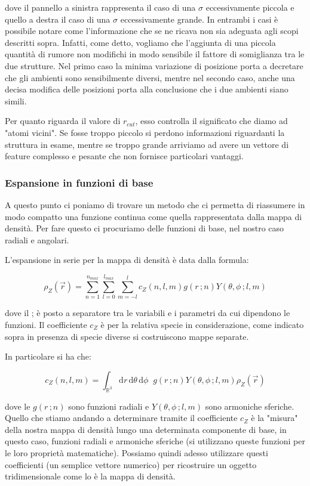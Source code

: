 dove il pannello a sinistra rappresenta il caso di una $\sigma$ eccessivamente piccola e quello a destra il caso di una $\sigma$ eccessivamente grande. In entrambi i casi è possibile notare come l'informazione che se ne ricava non sia adeguata agli scopi descritti sopra. Infatti, come detto, vogliamo che l'aggiunta di una piccola quantità di rumore non modifichi in modo sensibile il fattore di somiglianza tra le due strutture. Nel primo caso la minima variazione di posizione porta a decretare che gli ambienti sono sensibilmente diversi, mentre nel secondo caso, anche una decisa modifica delle posizioni porta alla conclusione che i due ambienti siano simili.

Per quanto riguarda il valore di $r_{cut}$, esso controlla il significato che diamo ad "atomi vicini". Se fosse troppo piccolo si perdono informazioni riguardanti la struttura in esame, mentre se troppo grande arriviamo ad avere un vettore di feature complesso e pesante che non fornisce particolari vantaggi.

\subsubsection{Espansione in funzioni di base}
A questo punto ci poniamo di trovare un metodo che ci permetta di riassumere in modo compatto una funzione continua come quella rappresentata dalla mappa di densità. Per fare questo ci procuriamo delle funzioni di base, nel nostro caso radiali e angolari.

L'espansione in serie per la mappa di densità è data dalla formula:

\begin{equation}
    \rho_Z(\vec{r}) = \sum_{n=1}^{n_{max}} \sum_{l=0}^{l_{max}} \sum_{m=-l}^{l} c_Z(n,l,m) g(r \,;n) Y(\theta, \phi \,; l,m)
\end{equation}

dove il ; è posto a separatore tra le variabili e i parametri da cui dipendono le funzioni. Il coefficiente $c_Z$ è per la relativa specie in considerazione, come indicato sopra in presenza di specie diverse si costruiscono mappe separate.

In particolare si ha che:

\begin{equation}
    c_Z(n,l,m) = \int_{\mathbb{R}^3} \mathrm{d}r\, \mathrm{d}\theta\, \mathrm{d}\phi \;\; g(r \,;n) Y(\theta, \phi \,; l,m) \rho_Z(\vec{r}) 
\end{equation}

dove le $g(r \,;n)$ sono funzioni radiali e $Y(\theta, \phi \,; l,m)$ sono armoniche sferiche. Quello che stiamo andando a determinare tramite il coefficiente $c_Z$ è la "misura" della nostra mappa di densità lungo una determinata componente di base, in questo caso, funzioni radiali e armoniche sferiche (si utilizzano queste funzioni per le loro proprietà matematiche). Possiamo quindi adesso utilizzare questi coefficienti (un semplice vettore numerico) per ricostruire un oggetto tridimensionale come lo è la mappa di densità. 

